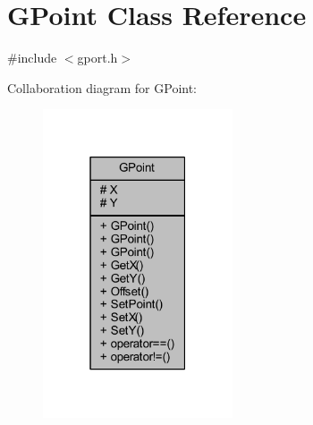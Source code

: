 \hypertarget{class_g_point}{}\section{G\+Point Class Reference}
\label{class_g_point}


{\ttfamily \#include $<$gport.\+h$>$}



Collaboration diagram for G\+Point\+:\nopagebreak
\begin{figure}[H]
\begin{center}
\leavevmode
\includegraphics[width=159pt]{class_g_point__coll__graph}
\end{center}
\end{figure}
